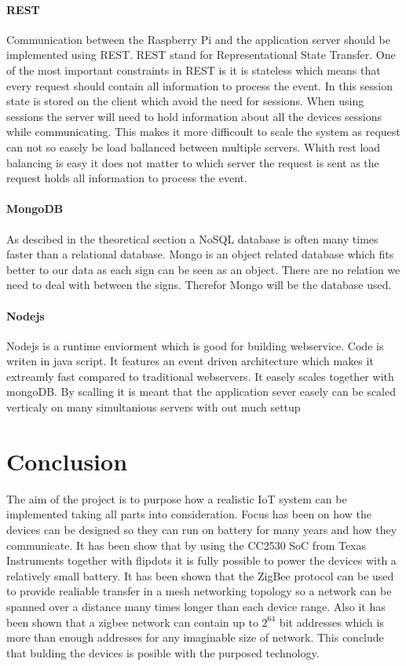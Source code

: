 \documentclass[a4paper,12pt,english]{article}
\begin{document}
\paragraph{REST}
Communication between the Raspberry Pi and the application server should be
implemented using REST. REST stand for Representational State Transfer.
One of the most important constraints in REST is it is stateless which means
that every request should contain all information to process the event. In this
session state is stored on the client which avoid the need for sessions. When
using sessions the server will need to hold information about all the devices
sessions while communicating. This makes it more difficoult to scale the system
as request can not so easely be load ballanced between multiple servers. Whith
rest load balancing is easy it does not matter to which server the request is
sent as the request holds all information to process the event.


\paragraph{MongoDB}
As descibed in the theoretical section a NoSQL database is often many times
faster than a relational database. Mongo is an object related database which
fits better to our data as each sign can be seen as an object. There are no
relation we need to deal with between the signs. Therefor Mongo will be the
database used. \cite{mongotest}

\paragraph{Nodejs}
Nodejs is a runtime enviorment which is good for building webservice. Code is
writen in java script. It features an event driven architecture which makes it
extreamly fast compared to traditional webservers. It easely scales together
with mongoDB. By scalling it is meant that the application sever easely can be
scaled verticaly on many simultanious servers with out much settup

\section{Conclusion}
The aim of the project is to purpose how a realistic IoT system can be
implemented taking all parts into consideration. Focus has been on how the
devices can be designed so they can run on battery for many years and how they
communicate. It has been show that by using the CC2530 SoC from Texas
Instruments together with flipdots it is fully possible to power the devices
with a relatively small battery. It has been shown that the ZigBee protocol can
be used to provide realiable transfer in a mesh networking topology so a network
can be spanned over a distance many times longer than each device range. Also it
has been shown that a zigbee network can contain up to $2^{64}$ bit addresses
which is more than enough addresses for any imaginable size of network. This
conclude that bulding the devices is posible with the purposed technology.
\end{document}
